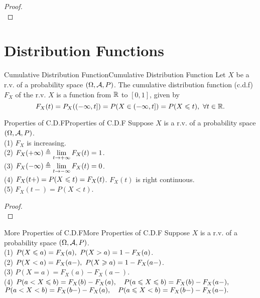 \documentclass{elegantbook}
\begin{document}
\begin{proof}
\\[4cm]\vspace{0.01cm}
\end{proof}

\section{Distribution Functions}

\begin{definition}{Cumulative Distribution Function}{Cumulative Distribution Function}
Let $X$ be a r.v. of a probability space $(\Omega,\mathcal{A}, P)$. The cumulative distribution function (c.d.f) $F_X$ of the r.v. $X$ is a function from $\mathbb{R}$ to $[0,1]$, given by
$$F_X (t)=P_X ((-\infty,t])=P(X\in(-\infty,t])=P(X\leqslant t),\ \forall t\in\mathbb{R}.$$
\vspace{0.01cm}
\end{definition}

\begin{theorem}{Properties of C.D.F}{Properties of C.D.F}
Suppose $X$ is a r.v. of a probability space $(\Omega,\mathcal{A}, P)$.\\
(1) $F_X$ is increasing.\\
(2) $F_X (+\infty)\triangleq \displaystyle\lim\limits_{t\to+\infty} F_X (t)=1$.\\
(3) $F_X (-\infty)\triangleq \displaystyle\lim\limits_{t\to-\infty} F_X (t)=0$.\\
(4) $F_X (t+)=P(X\leqslant t)=F_X (t)$. $F_X (t)$ is right continuous.\\
(5) $F_X (t-)=P(X<t)$.
\end{theorem}

\begin{proof}
\\[4cm]\vspace{0.01cm}
\end{proof}

\begin{corollary}{More Properties of C.D.F}{More Properties of C.D.F}
Suppose $X$ is a r.v. of a probability space $(\Omega,\mathcal{A}, P)$.\\
(1) $P(X\leqslant a)=F_X (a),\ P(X>a)=1-F_X (a)$.\\
(2) $P(X<a)=F_X (a-),\ P(X\geqslant a)=1-F_X (a-)$.\\
(3) $P(X=a)=F_X (a)-F_X (a-)$.\\
(4) $P(a<X\leqslant b)=F_X (b)-F_X (a),\quad P(a\leqslant X\leqslant b)=F_X (b)-F_X (a-),$\\
\quad$P(a<X<b)=F_X (b-)-F_X (a),\quad P(a\leqslant X<b)=F_X (b-)-F_X (a-).$
\end{corollary}
\end{document}
